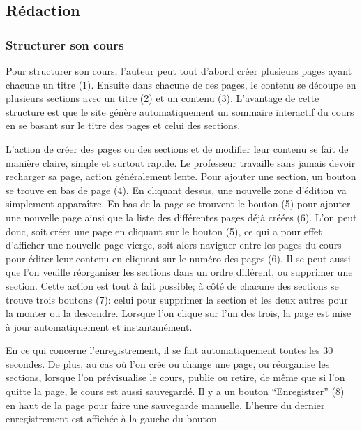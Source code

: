 \documentclass[letterpaper,10pt,oneside]{sphinxmanual}
\begin{document}
\subsection{Rédaction}
\label{functionalities:redaction}

\subsubsection{Structurer son cours}
\label{functionalities:structurer-son-cours}
Pour structurer son cours, l'auteur peut tout d'abord créer plusieurs pages ayant chacune un titre (1). Ensuite dans chacune de ces pages, le contenu se découpe en plusieurs sections avec un titre (2) et un contenu (3). L'avantage de cette structure est que le site génère automatiquement un sommaire interactif du cours en se basant sur le titre des pages et celui des sections.

L'action de créer des pages ou des sections et de modifier leur contenu se fait de manière claire, simple et surtout rapide. Le professeur travaille sans jamais devoir recharger sa page, action généralement lente. Pour ajouter une section, un bouton se trouve en bas de page (4). En cliquant dessus, une nouvelle zone d'édition va simplement apparaître. En bas de la page se trouvent le bouton (5) pour ajouter une nouvelle page ainsi que la liste des différentes pages déjà créées (6). L'on peut donc, soit créer une page en cliquant sur le bouton (5), ce qui a pour effet d'afficher une nouvelle page vierge, soit alors naviguer entre les pages du cours pour éditer leur contenu en cliquant sur le numéro des pages (6). Il se peut aussi que l'on veuille réorganiser les sections dans un ordre différent, ou supprimer une section. Cette action est tout à fait possible; à côté de chacune des sections se trouve trois boutons (7): celui pour supprimer la section et les deux autres pour la monter ou la descendre. Lorsque l'on clique sur l'un des trois, la page est mise à jour automatiquement et instantanément.

En ce qui concerne l'enregistrement, il se fait automatiquement toutes les 30 secondes. De plus, au cas où l'on crée ou change une page, ou réorganise les sections, lorsque l'on prévisualise le cours, publie ou retire, de même que si l'on quitte la page, le cours est aussi sauvegardé. Il y a un bouton ``Enregistrer'' (8) en haut de la page pour faire une sauvegarde manuelle. L'heure du dernier enregistrement est affichée à la gauche du bouton.
\end{document}
